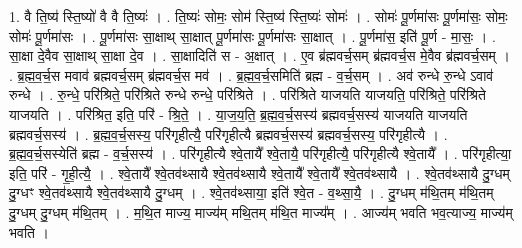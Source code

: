 \documentclass[17pt]{extarticle}
\begin{document}
1. वै ति॒ष्य॑ स्ति॒ष्यो॑ वै वै ति॒ष्यः॑ । . ति॒ष्यः॑ सोमः॒ सोम॑ स्ति॒ष्य॑ स्ति॒ष्यः॑ सोमः॑ । . सोमः॑ पू॒र्णमा॑सः पू॒र्णमा॑सः॒ सोमः॒ सोमः॑ पू॒र्णमा॑सः । . पू॒र्णमा॑सः सा॒क्षाथ् सा॒क्षात् पू॒र्णमा॑सः पू॒र्णमा॑सः सा॒क्षात् । . पू॒र्णमा॑स॒ इति॑ पू॒र्ण - मा॒सः॒ । . सा॒क्षा दे॒वैव सा॒क्षाथ् सा॒क्षा दे॒व । . सा॒क्षादिति॑ स - अ॒क्षात् । . ए॒व ब्र॑ह्मवर्च॒सम् ब्र॑ह्मवर्च॒स मे॒वैव ब्र॑ह्मवर्च॒सम् । . ब्र॒ह्म॒व॒र्च॒स मवाव॑ ब्रह्मवर्च॒सम् ब्र॑ह्मवर्च॒स मव॑ । . ब्र॒ह्म॒व॒र्च॒समिति॑ ब्रह्म - व॒र्च॒सम् । . अव॑ रुन्धे रु॒न्धे ऽवाव॑ रुन्धे । . रु॒न्धे॒ परि॑श्रिते॒ परि॑श्रिते रुन्धे रुन्धे॒ परि॑श्रिते । . परि॑श्रिते याजयति याजयति॒ परि॑श्रिते॒ परि॑श्रिते याजयति । . परि॑श्रित॒ इति॒ परि॑ - श्रि॒ते॒ । . या॒ज॒य॒ति॒ ब्र॒ह्म॒व॒र्च॒सस्य॑ ब्रह्मवर्च॒सस्य॑ याजयति याजयति ब्रह्मवर्च॒सस्य॑ । . ब्र॒ह्म॒व॒र्च॒सस्य॒ परि॑गृहीत्यै॒ परि॑गृहीत्यै ब्रह्मवर्च॒सस्य॑ ब्रह्मवर्च॒सस्य॒ परि॑गृहीत्यै । . ब्र॒ह्म॒व॒र्च॒सस्येति॑ ब्रह्म - व॒र्च॒सस्य॑ । . परि॑गृहीत्यै श्वे॒तायै᳚ श्वे॒तायै॒ परि॑गृहीत्यै॒ परि॑गृहीत्यै श्वे॒तायै᳚ । . परि॑गृहीत्या॒ इति॒ परि॑ - गृ॒ही॒त्यै॒ । . श्वे॒तायै᳚ श्वे॒तव॑थ्सायै श्वे॒तव॑थ्सायै श्वे॒तायै᳚ श्वे॒तायै᳚ श्वे॒तव॑थ्सायै । . श्वे॒तव॑थ्सायै दु॒ग्धम् दु॒ग्धꣳ श्वे॒तव॑थ्सायै श्वे॒तव॑थ्सायै दु॒ग्धम् । . श्वे॒तव॑थ्साया॒ इति॑ श्वे॒त - व॒थ्सा॒यै॒ । . दु॒ग्धम् म॑थि॒तम् म॑थि॒तम् दु॒ग्धम् दु॒ग्धम् म॑थि॒तम् । . म॒थि॒त माज्य॒ माज्य॑म् मथि॒तम् म॑थि॒त माज्य᳚म् । . आज्य॑म् भवति भव॒त्याज्य॒ माज्य॑म् भवति । \newline
\end{document}
